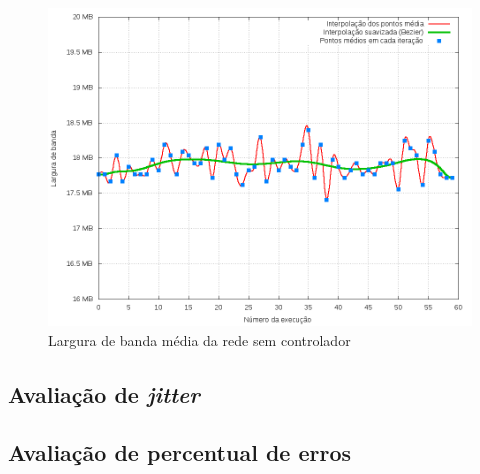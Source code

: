 \begin{figure}[!htb]
    \centering
    \label{fig:bandwidth-no-ctrl}
    \includegraphics[width=\linewidth]{img/bandwidth-no-ctrl}
    \caption{Largura de banda média da rede sem controlador}
\end{figure}


\subsection{Avaliação de \emph{jitter}}


\subsection{Avaliação de percentual de erros}




